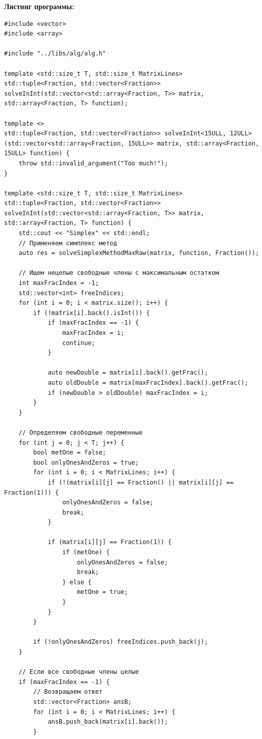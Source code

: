 \documentclass[a4paper,14pt]{extarticle}
\begin{document}
\textbf{Листинг программы: }
\begin{verbatim}
#include <vector>
#include <array>

#include "../libs/alg/alg.h"

template <std::size_t T, std::size_t MatrixLines>
std::tuple<Fraction, std::vector<Fraction>> solveInInt(std::vector<std::array<Fraction, T>> matrix, std::array<Fraction, T> function);

template <>
std::tuple<Fraction, std::vector<Fraction>> solveInInt<15ULL, 12ULL>(std::vector<std::array<Fraction, 15ULL>> matrix, std::array<Fraction, 15ULL> function) {
    throw std::invalid_argument("Too much!");
}

template <std::size_t T, std::size_t MatrixLines>
std::tuple<Fraction, std::vector<Fraction>> solveInInt(std::vector<std::array<Fraction, T>> matrix, std::array<Fraction, T> function) {
    std::cout << "Simplex" << std::endl;
    // Применяем симплекс метод
    auto res = solveSimplexMethodMaxRaw(matrix, function, Fraction());

    // Ищем нецелые свободные члены с максимальным остатком
    int maxFracIndex = -1;
    std::vector<int> freeIndices;
    for (int i = 0; i < matrix.size(); i++) {
        if (!matrix[i].back().isInt()) {
            if (maxFracIndex == -1) {
                maxFracIndex = i;
                continue;
            }

            auto newDouble = matrix[i].back().getFrac();
            auto oldDouble = matrix[maxFracIndex].back().getFrac();
            if (newDouble > oldDouble) maxFracIndex = i;
        }
    }

    // Определяем свободные переменные
    for (int j = 0; j < T; j++) {
        bool metOne = false;
        bool onlyOnesAndZeros = true;
        for (int i = 0; i < MatrixLines; i++) {
            if (!(matrix[i][j] == Fraction() || matrix[i][j] == Fraction(1))) {
                onlyOnesAndZeros = false;
                break;
            }

            if (matrix[i][j] == Fraction(1)) {
                if (metOne) {
                    onlyOnesAndZeros = false;
                    break;
                } else {
                    metOne = true;
                }
            }
        }

        if (!onlyOnesAndZeros) freeIndices.push_back(j);
    }

    // Если все свободные члены целые
    if (maxFracIndex == -1) {
        // Возвращаем ответ
        std::vector<Fraction> ansB;
        for (int i = 0; i < MatrixLines; i++) {
            ansB.push_back(matrix[i].back());
        }


\end{verbatim}
\end{document}
